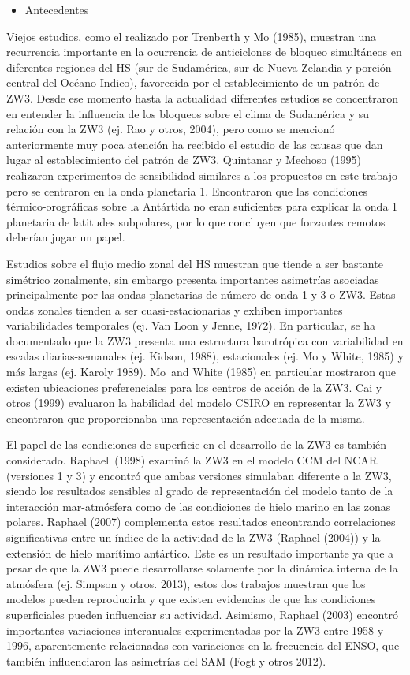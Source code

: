 \documentclass[spanish,a4paper]{book}
\providecommand{\tightlist}{%
  \setlength{\itemsep}{0pt}\setlength{\parskip}{0pt}}
\begin{document}
\begin{itemize}
\tightlist
\item
  Antecedentes
\end{itemize}

Viejos estudios, como el realizado por Trenberth y Mo (1985), muestran
una recurrencia importante en la ocurrencia de anticiclones de bloqueo
simultáneos en diferentes regiones del HS (sur de Sudamérica, sur de
Nueva Zelandia y porción central del Océano Indico), favorecida por el
establecimiento de un patrón de ZW3. Desde ese momento hasta la
actualidad diferentes estudios se concentraron en entender la influencia
de los bloqueos sobre el clima de Sudamérica y su relación con la ZW3
(ej. Rao y otros, 2004), pero como se mencionó anteriormente muy poca
atención ha recibido el estudio de las causas que dan lugar al
establecimiento del patrón de ZW3. Quintanar y Mechoso (1995) realizaron
experimentos de sensibilidad similares a los propuestos en este trabajo
pero se centraron en la onda planetaria 1. Encontraron que las
condiciones térmico-orográficas sobre la Antártida no eran suficientes
para explicar la onda 1 planetaria de latitudes subpolares, por lo que
concluyen que forzantes remotos deberían jugar un papel.

Estudios sobre el flujo medio zonal del HS muestran que tiende a ser
bastante simétrico zonalmente, sin embargo presenta importantes
asimetrías asociadas principalmente por las ondas planetarias de número
de onda 1 y 3 o ZW3. Estas ondas zonales tienden a ser
cuasi-estacionarias y exhiben importantes variabilidades temporales (ej.
Van Loon y Jenne, 1972). En particular, se ha documentado que la ZW3
presenta una estructura barotrópica con variabilidad en escalas
diarias-semanales (ej. Kidson, 1988), estacionales (ej. Mo y White,
1985) y más largas (ej. Karoly 1989). Mo~and White (1985) en particular
mostraron que existen ubicaciones preferenciales para los centros de
acción de la ZW3. Cai y otros (1999) evaluaron la habilidad del modelo
CSIRO en representar la ZW3 y encontraron que proporcionaba una
representación adecuada de la misma.

El papel de las condiciones de superficie en el desarrollo de la ZW3 es
también considerado. Raphael~(1998) examinó la ZW3 en el modelo CCM del
NCAR (versiones 1 y 3) y encontró que ambas versiones simulaban
diferente a la ZW3, siendo los resultados sensibles al grado de
representación del modelo tanto de la interacción mar-atmósfera como de
las condiciones de hielo marino en las zonas polares. Raphael (2007)
complementa estos resultados encontrando correlaciones significativas
entre un índice de la actividad de la ZW3 (Raphael (2004)) y la
extensión de hielo marítimo antártico. Este es un resultado importante
ya que a pesar de que la ZW3 puede desarrollarse solamente por la
dinámica interna de la atmósfera (ej. Simpson y otros. 2013), estos dos
trabajos muestran que los modelos pueden reproducirla y que existen
evidencias de que las condiciones superficiales pueden influenciar su
actividad. Asimismo, Raphael (2003) encontró importantes variaciones
interanuales experimentadas por la ZW3 entre 1958 y 1996, aparentemente
relacionadas con variaciones en la frecuencia del ENSO, que también
influenciaron las asimetrías del SAM (Fogt y otros 2012).
\end{document}
